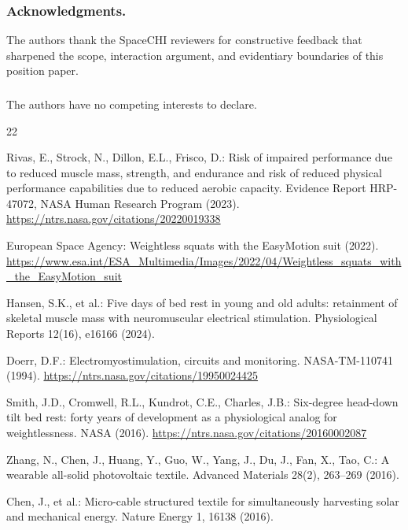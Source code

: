 \documentclass[runningheads]{llncs}
\begin{document}
\begin{credits}
\subsubsection{Acknowledgments.} The authors thank the SpaceCHI reviewers for constructive feedback that sharpened the scope, interaction argument, and evidentiary boundaries of this position paper.

\subsubsection{\discintname} The authors have no competing interests to declare.
\end{credits}

\begin{thebibliography}{22}

Rivas, E., Strock, N., Dillon, E.L., Frisco, D.: Risk of impaired performance due to reduced muscle mass, strength, and endurance and risk of reduced physical performance capabilities due to reduced aerobic capacity. Evidence Report HRP-47072, NASA Human Research Program (2023). \url{https://ntrs.nasa.gov/citations/20220019338}

European Space Agency: Weightless squats with the EasyMotion suit (2022). \url{https://www.esa.int/ESA_Multimedia/Images/2022/04/Weightless_squats_with_the_EasyMotion_suit}

Hansen, S.K., et al.: Five days of bed rest in young and old adults: retainment of skeletal muscle mass with neuromuscular electrical stimulation. Physiological Reports 12(16), e16166 (2024). 

Doerr, D.F.: Electromyostimulation, circuits and monitoring. NASA-TM-110741 (1994). \url{https://ntrs.nasa.gov/citations/19950024425}

Smith, J.D., Cromwell, R.L., Kundrot, C.E., Charles, J.B.: Six-degree head-down tilt bed rest: forty years of development as a physiological analog for weightlessness. NASA (2016). \url{https://ntrs.nasa.gov/citations/20160002087}

Zhang, N., Chen, J., Huang, Y., Guo, W., Yang, J., Du, J., Fan, X., Tao, C.: A wearable all-solid photovoltaic textile. Advanced Materials 28(2), 263--269 (2016). 

Chen, J., et al.: Micro-cable structured textile for simultaneously harvesting solar and mechanical energy. Nature Energy 1, 16138 (2016). 


\end{thebibliography}
\end{document}
